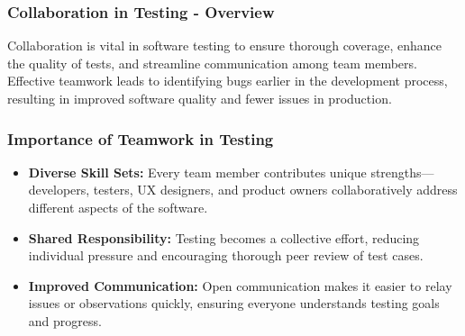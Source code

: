 \documentclass{beamer}
\begin{document}
\begin{frame}[fragile]
    \frametitle{Collaboration in Testing - Overview}
    Collaboration is vital in software testing to ensure thorough coverage, enhance the quality of tests, and streamline communication among team members. Effective teamwork leads to identifying bugs earlier in the development process, resulting in improved software quality and fewer issues in production.
\end{frame}

\begin{frame}[fragile]
    \frametitle{Importance of Teamwork in Testing}
    \begin{itemize}
        \item \textbf{Diverse Skill Sets:} Every team member contributes unique strengths—developers, testers, UX designers, and product owners collaboratively address different aspects of the software.
        \item \textbf{Shared Responsibility:} Testing becomes a collective effort, reducing individual pressure and encouraging thorough peer review of test cases.
        \item \textbf{Improved Communication:} Open communication makes it easier to relay issues or observations quickly, ensuring everyone understands testing goals and progress.
    \end{itemize}
\end{frame}
\end{document}
